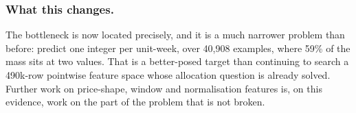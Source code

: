 \subsubsection*{What this changes.}
The bottleneck is now located precisely, and it is a much narrower problem than before: predict
one integer per unit-week, over 40{,}908 examples, where 59\% of the mass sits at two values. That
is a better-posed target than continuing to search a 490k-row pointwise feature space whose
allocation question is already solved. Further work on price-shape, window and normalisation
features is, on this evidence, work on the part of the problem that is not broken.
